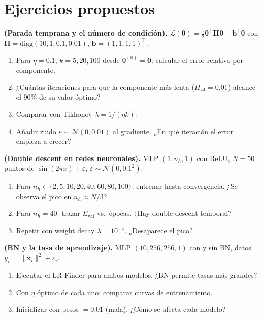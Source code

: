 \section*{Ejercicios propuestos}

\begin{ejercicio}
\textbf{(Parada temprana y el número de condición).}
$\mathcal{L}(\bm{\theta}) = \frac{1}{2}\bm{\theta}^\top\bm{H}
\bm{\theta} - \bm{b}^\top\bm{\theta}$ con
$\bm{H} = \text{diag}(10, 1, 0.1, 0.01)$,
$\bm{b} = (1,1,1,1)^\top$.
\begin{enumerate}[label=(\alph*)]
  \item Para $\eta = 0.1$, $k = 5, 20, 100$ desde
        $\bm{\theta}^{(0)} = \bm{0}$: calcular el error relativo por
        componente.
  \item ¿Cuántas iteraciones para que la componente más lenta
        ($H_{44} = 0.01$) alcance el $90\%$ de su valor óptimo?
  \item Comparar con Tikhonov $\lambda = 1/(\eta k)$.
  \item Añadir ruido $\varepsilon \sim \mathcal{N}(0, 0.01)$ al
        gradiente. ¿En qué iteración el error empieza a crecer?
\end{enumerate}
\end{ejercicio}

\begin{ejercicio}
\textbf{(Double descent en redes neuronales).}
MLP $(1, n_h, 1)$ con ReLU, $N = 50$ puntos de
$\sin(2\pi x) + \varepsilon$, $\varepsilon \sim \mathcal{N}(0,0.1^2)$.
\begin{enumerate}[label=(\alph*)]
  \item Para $n_h \in \{2, 5, 10, 20, 40, 60, 80, 100\}$: entrenar
        hasta convergencia. ¿Se observa el pico en $n_h \approx N/3$?
  \item Para $n_h = 40$: trazar $E_{\text{val}}$ vs.\ épocas. ¿Hay
        double descent temporal?
  \item Repetir con weight decay $\lambda = 10^{-4}$. ¿Desaparece el
        pico?
\end{enumerate}
\end{ejercicio}

\begin{ejercicio}
\textbf{(BN y la tasa de aprendizaje).}
MLP $(10, 256, 256, 1)$ con y sin BN, datos
$y_i = \|\bm{x}_i\|^2 + \varepsilon_i$.
\begin{enumerate}[label=(\alph*)]
  \item Ejecutar el LR Finder para ambos modelos. ¿BN permite tasas
        más grandes?
  \item Con $\eta$ óptimo de cada uno: comparar curvas de
        entrenamiento.
  \item Inicializar con pesos $= 0.01$ (mala). ¿Cómo se afecta cada
        modelo?
\end{enumerate}
\end{ejercicio}

